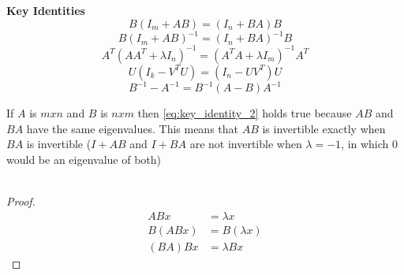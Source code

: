 \documentclass{article}
\begin{document}
\begin{axiom}
  \textbf{Key Identities}
  \begin{equation}
    B(I_m+AB)=(I_n+BA)B
  \end{equation}
  \begin{equation}
    \label{eq:key_identity_2}
    B(I_m+AB)^{-1}=(I_n+BA)^{-1}B
  \end{equation}
  \begin{equation}
    A^T(AA^T+\lambda I_n)^{-1}=(A^TA+\lambda I_m)^{-1}A^T
  \end{equation}
  \begin{equation}
    U(I_k-V^TU)=(I_n-UV^T)U
  \end{equation}
  \begin{equation}
    B^{-1}-A^{-1}=B^{-1}(A-B)A^{-1}
  \end{equation}
\end{axiom}

\begin{fact}
  If $A$ is $mxn$ and $B$ is $nxm$ then \eqref{eq:key_identity_2} holds true because
  $AB$ and $BA$ have the same eigenvalues.  This means that $AB$ is invertible exactly when
  $BA$ is invertible ($I+AB$ and $I+BA$ are not invertible when $\lambda=-1$, in which $0$
  would be an eigenvalue of both)\\ \\
  \begin{proof}
    \begin{align*}
      ABx    & =\lambda x    \\
      B(ABx) & =B(\lambda x) \\
      (BA)Bx & =\lambda Bx
    \end{align*}
  \end{proof}
\end{fact}
\end{document}
